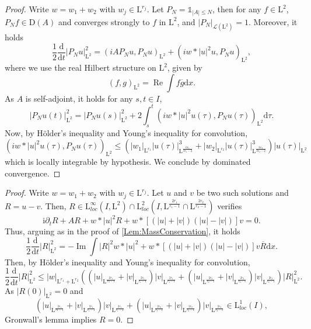 \documentclass{article}
\def\R{\mathbb R}
\def\L{\mathrm L}
\def \p {\partial}
\DeclareMathOperator{\re}{Re}
\DeclareMathOperator{\im}{Im}
\def\d{\mathrm{d}}
\newcommand{\indic}[1]{\mathds{1}_{#1}}
\newtheorem{lemme}[theo]{Lemma}
\theoremstyle{definition}
\numberwithin{equation}{section}
\newcommand{\complexI}{\mathrm{i}} %
\begin{document}
\begin{proof}
    
    Write $w=w_{1}+w_2$ with $w_j\in\L^{r_j}$. Let $P_N = \indic{|A|\leqslant N}$, then for any $f\in\L^2$, $P_N f\in\mathrm{D}(A)$ and converges strongly to $f$ in $\L^2$, and $|P_N|_{\mathcal{L}(\L^2)}=1$. Moreover, it holds
    $$\frac{1}{2}\frac{\d}{\d t}|P_Nu|_{\L^2}^2 = (iA P_N u,P_N u)_{\L^2} + (iw*|u|^2u,P_N u)_{\L^2},$$
    where we use the real Hilbert structure on $\L^2$, given by
    $$(f,g)_{\L^2}=\re\int f\overline{g}\d x.$$
    As $A$ is self-adjoint, it holds for any $s,t\in I$,
    $$|P_Nu(t)|_{\L^2}^2=|P_Nu(s)|_{\L^2}^2+2\int_{s}^{t}(iw*|u|^2u(\tau),P_N u(\tau))_{\L^2}\d\tau.$$
    Now, by Hölder's inequality and Young's inequality for convolution,
    $$\left(iw*|u|^2u(\tau),P_N u(\tau)\right)_{\L^2}\leqslant \left(|w_1|_{\L^{r_1}}|u(\tau)|_{\L^{\frac{6r_1}{3r_1-2}}}^3+|w_2|_{\L^{r_2}}|u(\tau)|_{\L^{\frac{6r_2}{3r_2-2}}}^3\right)|u(\tau)|_{\L^2}$$
    which is locally integrable by hypothesis. We conclude by dominated convergence.

\end{proof}


\begin{proof}

    Write $w=w_{1}+w_2$ with $w_j\in\L^{r_j}$. Let $u$ and $v$ be two such solutions and $R=u-v$. Then, $R\in\L^\infty_{loc}(I,\L^2)\cap\L^2_{loc}\left(I,\L^{\frac{2r_1}{r_1-1}}\cap\L^{\frac{2r_2}{r_2-1}}\right)$ verifies
    $$\complexI\p_t R + AR +w*|u|^2R+w*\left[(|u|+|v|)(|u|-|v|)\right]v = 0.$$
    Thus, arguing as in the proof of \cref{Lem:MassConservation}, it holds
    $$\frac{1}{2}\frac{\d}{\d t}|R|_{\L^2}^2 = -\im\int |R|^2w*|u|^2 + w*\left[(|u|+|v|)(|u|-|v|)\right]v\overline{R} \d x.$$
    Then, by Hölder's inequality and Young's inequality for convolution,
    $$\frac{1}{2}\frac{\d}{\d t}|R|_{\L^2}^2 \leqslant |w|_{\L^{r_1}+\L^{r_2}}\left( \left(|u|_{\L^{\frac{2r_1}{r1-1}}}+|v|_{\L^{\frac{2r_1}{r_1-1}}} \right)|v|_{\L^{\frac{2r_1}{r_1-1}}}+\left(|u|_{\L^{\frac{2r_2}{r_2-1}}}+|v|_{\L^{\frac{2r_2}{r_2-1}}} \right)|v|_{\L^{\frac{2r_2}{r_2-1}}}\right)|R|_{\L^2}^2.$$
    As $|R(0)|_{\L^2}=0$ and $$\left(|u|_{\L^{\frac{2r_1}{r1-1}}}+|v|_{\L^{\frac{2r_1}{r_1-1}}} \right)|v|_{\L^{\frac{2r_1}{r_1-1}}}+\left(|u|_{\L^{\frac{2r_2}{r_2-1}}}+|v|_{\L^{\frac{2r_2}{r_2-1}}} \right)|v|_{\L^{\frac{2r_2}{r_2-1}}}\in\L^1_{loc}(I),$$ Gronwall's lemma implies $R=0$.

\end{proof}
\end{document}
